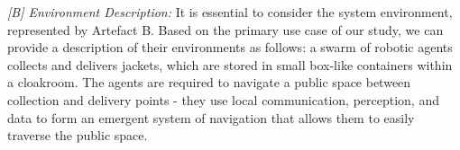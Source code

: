 \documentclass[runningheads]{llncs}
\begin{document}
\emph{[B] Environment Description:}
It is essential to consider the system environment, represented by Artefact B.
Based on the primary use case of our study, we can provide a description of their environments as follows: a swarm of robotic agents collects and delivers jackets, which are stored in small box-like containers within a cloakroom. The agents are required to navigate a public space between collection and delivery points - they use local communication, perception, and data to form an emergent system of navigation that allows them to easily traverse the public space.


\end{document}
